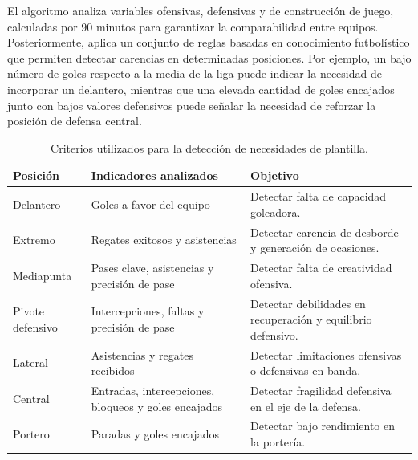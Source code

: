 El algoritmo analiza variables ofensivas, defensivas y de construcción de juego, calculadas por 90 minutos para garantizar la comparabilidad entre equipos. Posteriormente, aplica un conjunto de reglas basadas en conocimiento futbolístico que permiten detectar carencias en determinadas posiciones. Por ejemplo, un bajo número de goles respecto a la media de la liga puede indicar la necesidad de incorporar un delantero, mientras que una elevada cantidad de goles encajados junto con bajos valores defensivos puede señalar la necesidad de reforzar la posición de defensa central.

\begin{table}[H]
\centering
\caption{Criterios utilizados para la detección de necesidades de plantilla.}
\label{tab:criterios_necesidades}
\begin{tabular}{|l|p{5cm}|p{5cm}|}
\hline
\textbf{Posición} & \textbf{Indicadores analizados} & \textbf{Objetivo} \\
\hline

Delantero &
Goles a favor del equipo &
Detectar falta de capacidad goleadora. \\

\hline

Extremo &
Regates exitosos y asistencias &
Detectar carencia de desborde y generación de ocasiones. \\

\hline

Mediapunta &
Pases clave, asistencias y precisión de pase &
Detectar falta de creatividad ofensiva. \\

\hline

Pivote defensivo &
Intercepciones, faltas y precisión de pase &
Detectar debilidades en recuperación y equilibrio defensivo. \\

\hline

Lateral &
Asistencias y regates recibidos &
Detectar limitaciones ofensivas o defensivas en banda. \\

\hline

Central &
Entradas, intercepciones, bloqueos y goles encajados &
Detectar fragilidad defensiva en el eje de la defensa. \\

\hline

Portero &
Paradas y goles encajados &
Detectar bajo rendimiento en la portería. \\

\hline

\end{tabular}
\end{table}


